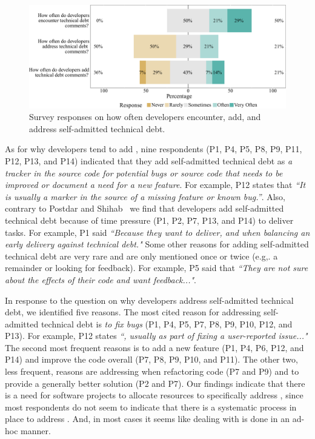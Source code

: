  
 \begin{figure}[t]
 	\centering
 	\includegraphics[width=1\columnwidth]{responses_question.pdf}
 	\caption{Survey responses on how often developers encounter, add, and address self-admitted technical debt.}
 	\label{fig:encouner_add_address}
 \end{figure}






As for why developers tend to add \SATD, nine respondents (P1, P4, P5, P8, P9, P11, P12, P13, and P14) indicated that they add self-admitted technical debt as \emph{a tracker in the source code for potential bugs or source code that needs to be improved or document a need for a new feature}. For example, P12 states that \textit{``It is usually a marker in the source of a missing feature or known bug.''}. Also, contrary to Postdar and Shihab~\cite{Potdar2014ICSME} we find that developers add self-admitted technical debt because of time pressure (P1, P2, P7, P13, and P14) to deliver tasks. For example, P1 said \textit{``Because they want to deliver, and when balancing an early delivery against technical debt."} Some other reasons for adding self-admitted technical debt are very rare and are only mentioned once or twice (e.g,. a remainder or looking for feedback). For example, P5 said that \textit{``They are not sure about the effects of their code and want feedback..."}.

In response to the question on why developers address self-admitted technical debt, we identified five reasons. The most cited reason for addressing self-admitted technical debt is \emph{to fix bugs} (P1, P4, P5, P7, P8, P9, P10, P12, and P13). For example, P12 states \textit{``, usually as part of fixing a user-reported issue..."} The second most frequent reasons is to add a new feature (P1, P4, P6, P12, and P14) and improve the code overall (P7, P8, P9, P10, and P11). The other two, less frequent, reasons are addressing \SATD when refactoring code (P7 and P9) and to provide a generally better solution (P2 and P7). Our findings indicate that there is a need for software projects to allocate resources to specifically address \SATD, since most respondents do not seem to indicate that there is a systematic process in place to address \SATD. And, in most cases it seems like dealing with \SATD is done in an ad-hoc manner.




